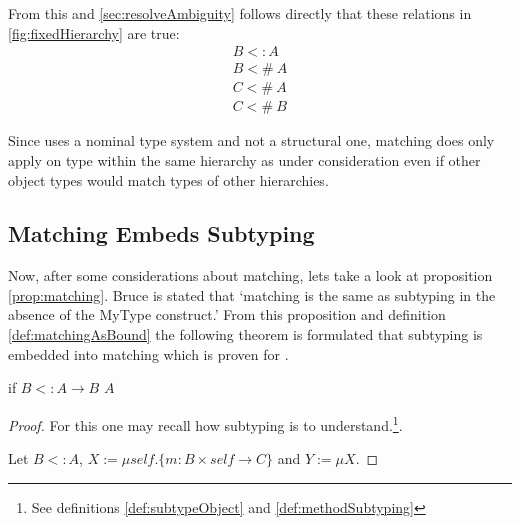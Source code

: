 From this and \cref{sec:resolveAmbiguity} follows directly that these
relations in \cref{fig:fixedHierarchy} are true:
\begin{align}
B <: A \\
B <\!\!\#~A \label{alg:match} \\
C <\!\!\#~A \\
C <\!\!\#~B
\end{align}



Since \ooplss uses a nominal type system and not a structural one,
matching does only apply on type within the same hierarchy as under
consideration even if other object types would match types of other
hierarchies.

\subsection{Matching Embeds Subtyping}
Now, after some considerations about matching, lets take a look at
proposition \ref{prop:matching}. Bruce is stated that `matching is
the same as subtyping in the absence of the MyType construct.' From
this proposition and definition \ref{def:matchingAsBound} the following
theorem is formulated that subtyping is embedded into matching which is
proven for \ooplss.

\begin{thm}
	\label{thm:matchinIsSubtyping}
	if $B <: A \rightarrow B$ \match $A$
\end{thm}

\begin{proof}
	For this one may recall how subtyping is to understand.\footnote{See
	definitions \ref{def:subtypeObject} and \ref{def:methodSubtyping}}.

	Let $B <: A$, $X := \mu self.\{m :
	B \times self \rightarrow C \} $ and $Y := \mu X.  $

%
\end{proof}

